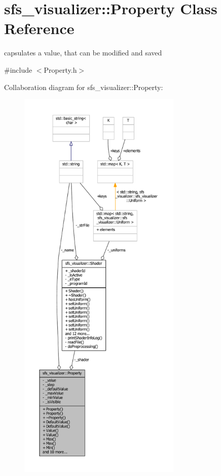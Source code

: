\section{sfs\-\_\-visualizer\-:\-:Property Class Reference}
\label{classsfs__visualizer_1_1Property}


capsulates a value, that can be modified and saved  




{\ttfamily \#include $<$Property.\-h$>$}



Collaboration diagram for sfs\-\_\-visualizer\-:\-:Property\-:\nopagebreak
\begin{figure}[H]
\begin{center}
\leavevmode
\includegraphics[height=550pt]{d0/d3c/classsfs__visualizer_1_1Property__coll__graph}
\end{center}
\end{figure}
